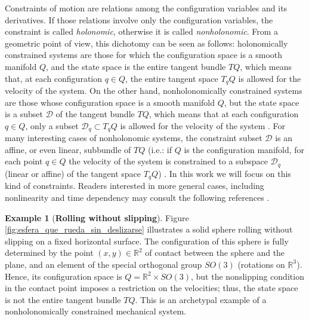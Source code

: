 \documentclass{aims}
\numberwithin{equation}{section}
\theoremstyle{definition}
\newtheorem{example}{Example}[section]
\begin{document}
Constraints of motion are relations among the configuration variables and its derivatives. If those relations involve only the configuration variables, the constraint is called {\it holonomic}, otherwise it is called {\it nonholonomic}. From a geometric point of view, this dichotomy can be seen as follows: holonomically constrained systems are those for which the configuration space is a smooth manifold $Q$, and the state space is the entire tangent bundle $TQ$, which means that, at each configuration $q\in Q$, the entire tangent space $T_qQ$ is allowed for the velocity of the system. On the other hand, nonholonomically constrained systems are those whose configuration space is a smooth manifold $Q$, but the state space is a subset ${\mathcal D}$ of the tangent bundle $TQ$, which means that at each configuration $q\in Q$, only a subset ${\mathcal D}_q\subset T_qQ$ is allowed for the velocity of the system \cite{bloch2015nonholonomic,cortes2002non,lewis2003lagrangian}. For many interesting cases of nonholonomic systems, the constraint subset ${\mathcal D}$ is an affine, or even linear, subbundle of $TQ$ (i.e.: if $Q$ is the configuration manifold, for each point $q\in Q$ the velocity of the system is constrained to a subspace ${\mathcal D}_q$ (linear or affine) of the tangent space $T_qQ$) \cite{Leon1996geometry-lagrangian, Carinena1993geometry-lagrange-multiplier}. In this work we will focus on this kind of constraints. Readers interested in more general cases, including nonlinearity and time dependency may consult the following references \cite{krupkova1997mechanical, krupkova2009nonholonomic-variational, krupkova2010geom-mech-on-nonholonomic-submanifolds, Leon1997nonlinear-nonholonomic, Ranada1994time-dependent-nonholonomic, Budapest1999}.

\begin{example}[\bf Rolling without slipping]
Figure \ref{fig:esfera_que_rueda_sin_deslizarse} illustrates a solid sphere rolling without slipping on a fixed horizontal surface. The configuration of this sphere is fully determined by the point $(x, y)\in \mathbb{R}^2$ of contact between the sphere and the plane, and an element of the special orthogonal group $SO(3)$ (rotations on $\mathbb{R}^3$). Hence, its configuration space is $Q  = \mathbb{R}^2\times SO(3)$, but the nonslipping condition in the contact point imposes a restriction on the velocities; thus, the state space is not the entire tangent bundle $TQ$. This is an archetypal example of a nonholonomically constrained mechanical system.
\end{example}
\end{document}
